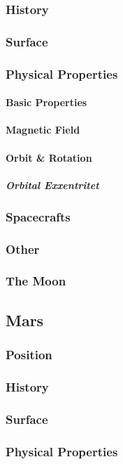 \subsubsection{History}
\subsubsection{Surface}
\subsubsection{Physical Properties}
\paragraph{Basic Properties}
\paragraph{Magnetic Field}
\paragraph{Orbit \& Rotation}
\subparagraph{Orbital Exxentritet}
\subsubsection{Spacecrafts}
\subsubsection{Other}
\subsubsection{The Moon}
\label{planet:earth:moon}

\subsection{Mars}
\subsubsection{Position}
\subsubsection{History}
\subsubsection{Surface}
\subsubsection{Physical Properties}
